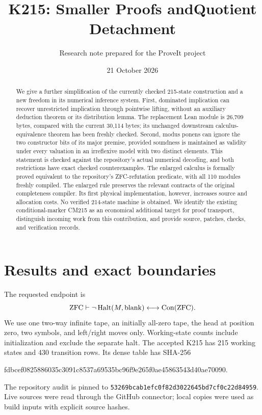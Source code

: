 \documentclass[11pt]{article}
\title{K215: Smaller Proofs and\newline Quotient Detachment}
\author{Research note prepared for the ProveIt project}\date{21 October 2026}
\newcommand{\pin}{\texttt{53269bcab1efc0f82d3022645bd7cf0c22d84959}}
\begin{document}
\maketitle
\begin{abstract}
We give a further simplification of the currently checked 215-state construction and a new freedom in its numerical inference system. First, dominated implication can recover unrestricted implication through pointwise lifting, without an auxiliary deduction theorem or its distribution lemma. The replacement Lean module is 26,709 bytes, compared with the current 30,114 bytes; its unchanged downstream calculus-equivalence theorem has been freshly checked. Second, modus ponens can ignore the two constructor bits of its major premise, provided soundness is maintained as validity under every valuation in an irreflexive model with two distinct elements. This statement is checked against the repository's actual numerical decoding, and both restrictions have exact checked counterexamples. The enlarged calculus is formally proved equivalent to the repository's ZFC-refutation predicate, with all 110 modules freshly compiled. The enlarged rule preserves the relevant contracts of the original completeness compiler. Its first physical implementation, however, increases source and allocation costs. No verified 214-state machine is obtained. We identify the existing conditional-marker CM215 as an economical additional target for proof transport, distinguish incoming work from this contribution, and provide source, patches, checks, and verification records.
\end{abstract}
\setcounter{tocdepth}{1}\tableofcontents\newpage

\section{Results and exact boundaries}

The requested endpoint is
\[
 \mathrm{ZFC}\vdash \neg\operatorname{Halt}(M,\mathrm{blank})\longleftrightarrow\operatorname{Con}(\mathrm{ZFC}).
\]
We use one two-way infinite tape, an initially all-zero tape, the head at position zero, two symbols, and left/right moves only. Working-state counts include initialization and exclude the separate halt. The accepted K215 has 215 working states and 430 transition rows. Its dense table has SHA-256
\begin{center}\small\ttfamily
fdbcef0825886035c3091c8537a69535bc96f9e265f0ae45863543d40ae70090.
\end{center}
The repository audit is pinned to \pin. Live sources were read through the GitHub connector; local copies were used as build inputs with explicit source hashes.
\end{document}

